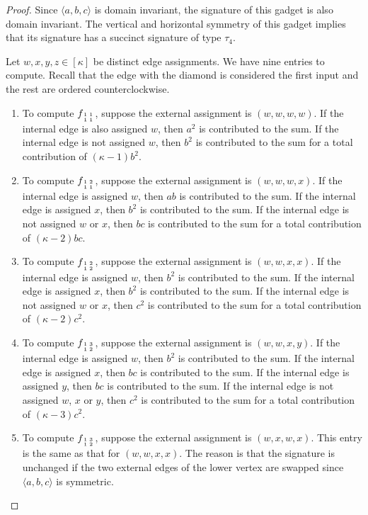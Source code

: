 \documentclass[11pt]{article}
\newcommand{\subMat}[4]{\mbox{\scriptsize $\begin{smallmatrix} #1 & #4 \\ #2 & #3 \end{smallmatrix}$}}
\begin{document}
\begin{proof}
 Since $\langle a,b,c \rangle$ is domain invariant,
 the signature of this gadget is also domain invariant.
 The vertical and horizontal symmetry of this gadget implies that its signature has a succinct signature of type $\tau_4$.
 
 Let $w,x,y,z \in [\kappa]$ be distinct edge assignments.
 We have nine entries to compute.
 Recall that the edge with the diamond is considered the first input and the rest are ordered counterclockwise.
 \begin{enumerate}
  \item To compute $f_{\subMat{1}{1}{1}{1}}$,
  suppose the external assignment is $(w,w,w,w)$.
  If the internal edge is also assigned $w$,
  then $a^2$ is contributed to the sum.
  If the internal edge is not assigned $w$,
  then $b^2$ is contributed to the sum for a total contribution of $(\kappa - 1) b^2$.
  
  \item To compute $f_{\subMat{1}{1}{1}{2}}$,
  suppose the external assignment is $(w,w,w,x)$.
  If the internal edge is assigned $w$,
  then $a b$ is contributed to the sum.
  If the internal edge is assigned $x$,
  then $b^2$ is contributed to the sum.
  If the internal edge is not assigned $w$ or $x$,
  then $b c$ is contributed to the sum for a total contribution of $(\kappa - 2) b c$.
  
  \item To compute $f_{\subMat{1}{1}{2}{2}}$,
  suppose the external assignment is $(w,w,x,x)$.
  If the internal edge is assigned $w$,
  then $b^2$ is contributed to the sum.
  If the internal edge is assigned $x$,
  then $b^2$ is contributed to the sum.
  If the internal edge is not assigned $w$ or $x$,
  then $c^2$ is contributed to the sum for a total contribution of $(\kappa - 2) c^2$.
  
  \item To compute $f_{\subMat{1}{1}{2}{3}}$,
  suppose the external assignment is $(w,w,x,y)$.
  If the internal edge is assigned $w$,
  then $b^2$ is contributed to the sum.
  If the internal edge is assigned $x$,
  then $b c$ is contributed to the sum.
  If the internal edge is assigned $y$,
  then $b c$ is contributed to the sum.
  If the internal edge is not assigned $w$, $x$ or $y$,
  then $c^2$ is contributed to the sum for a total contribution of $(\kappa - 3) c^2$.
  
  \item To compute $f_{\subMat{1}{1}{2}{3}}$,
  suppose the external assignment is $(w,x,w,x)$.
  This entry is the same as that for $(w,w,x,x)$.
  The reason is that the signature is unchanged if the two external edges of the lower vertex are swapped since $\langle a,b,c \rangle$ is symmetric.
  

\end{enumerate}
\end{proof}
\end{document}
